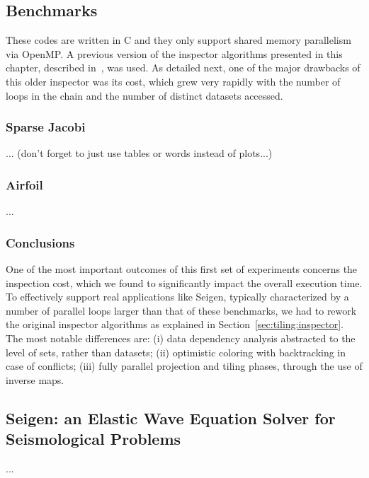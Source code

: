 

\subsection{Benchmarks}
These codes are written in C and they only support shared memory parallelism via OpenMP. A previous version of the inspector algorithms presented in this chapter, described in~\cite{st-paper}, was used. As detailed next, one of the major drawbacks of this older inspector was its cost, which grew very rapidly with the number of loops in the chain and the number of distinct datasets accessed. 

\subsubsection{Sparse Jacobi}
... (don't forget to just use tables or words instead of plots...)

\subsubsection{Airfoil}
...

\subsubsection{Conclusions}
One of the most important outcomes of this first set of experiments concerns the inspection cost, which we found to significantly impact the overall execution time. To effectively support real applications like Seigen, typically characterized by a number of parallel loops larger than that of these benchmarks, we had to rework the original inspector algorithms as explained in Section~\ref{sec:tiling:inspector}. The most notable differences are: (i) data dependency analysis abstracted to the level of sets, rather than datasets; (ii) optimistic coloring with backtracking in case of conflicts; (iii) fully parallel projection and tiling phases, through the use of inverse maps. 

\subsection{Seigen: an Elastic Wave Equation Solver for Seismological Problems}
\label{sec:tiling:seigen}
...
